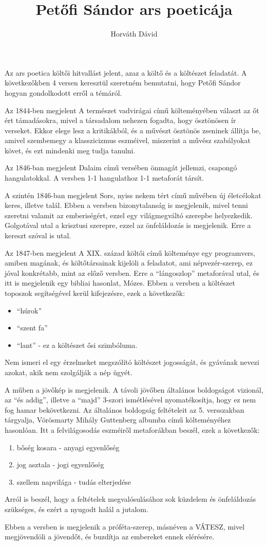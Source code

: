 \documentclass[magyar]{article}
\title{Petőfi Sándor ars poeticája}
\author{Horváth Dávid}
\begin{document}
	\maketitle
	Az ars poetica költői hitvallást jelent, azaz a költő és a költészet feladatát. A következőkben 4 versen keresztül szeretném bemutatni, hogy Petőfi Sándor hogyan gondolkodott erről a témáról.
	
	Az 1844-ben megjelent A természet vadvirágai című költeményében választ az őt ért támadásokra, mivel a társadalom nehezen fogadta, hogy ösztönösen ír verseket. Ekkor elege lesz a kritikákból, és a művészt ösztönös zseninek állítja be, amivel szembemegy a klasszicizmus eszméivel, miszerint a művész szabályokat követ, és ezt mindenki meg tudja tanulni.
	
	Az 1846-ban megjelent Dalaim című versében önmagát jellemzi, csapongó hangulatokkal. A versben 1-1 hangulathoz 1-1 metaforát társít.
	
	A szintén 1846-ban megjelent Sors, nyiss nekem tért című művében új életcélokat keres, illetve talál. Ebben a versben bizonytalanság is megjelenik, mivel tenni szeretni valamit az emberiségért, ezzel egy világmegváltó szerepbe helyezkedik. Golgotával utal a krisztusi szerepre, ezzel az önfeláldozás is megjelenik. Erre a kereszt szóval is utal.
	
	Az 1847-ben megjelent A XIX. század költői című költeménye egy programvers, amiben magának, és költőtársainak kijelöli a feladatot, ami népvezér-szerep, ez jóval konkrétabb, mint az előző versben. Erre a \enquote{lángoszlop} metaforával utal, és itt is megjelenik egy bibliai hasonlat, Mózes. Ebben a versben a költészet toposzok segítségével kerül kifejezésre, ezek a következők:
	\begin{itemize}
		\item \enquote{húrok}
		\item \enquote{szent fa}
		\item \enquote{lant} - ez a költészet ősi szimbóluma.
	\end{itemize}
	Nem ismeri el egy érzelmeket megszólító költészet jogosságát, és gyávának nevezi azokat, akik nem szolgálják a nép ügyét. 
	
	A műben a jövőkép is megjelenik. A távoli jövőben általános boldogságot vizionál, az \enquote{és addig}, illetve a \enquote{majd} 3-szori ismétlésével nyomatékosítja, hogy ez nem fog hamar bekövetkezni. Az általános boldogság feltételeit az 5. versszakban tárgyalja, Vörösmarty Mihály Guttenberg albumba című költeményéhez hasonlóan. Itt a felvilágosodás eszméiről metaforákban beszél, ezek a következők:
	\begin{enumerate}
		\item bőség kosara - anyagi egyenlőség
		\item jog asztala - jogi egyenlőség
		\item szellem napvilága - tudás elterjedése
	\end{enumerate}
	Arról is beszél, hogy a feltételek megvalósulásához sok küzdelem és önfeláldozás szükséges, és ezért a nyugodt halál a jutalom.
	
	Ebben a versben is megjelenik a próféta-szerep, másnéven a VÁTESZ, mivel megjövendöli a jövendőt, és buzdítja az embereket ennek elérésére.
\end{document}
